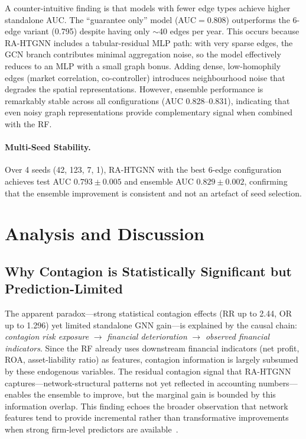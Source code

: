 \documentclass[3p,times,procedia]{elsarticle}
\begin{document}
A counter-intuitive finding is that models with fewer edge types achieve higher standalone AUC.
The ``guarantee only'' model (AUC$=$0.808) outperforms the 6-edge variant (0.795) despite having only $\sim$40 edges per year.
This occurs because RA-HTGNN includes a tabular-residual MLP path: with very sparse edges, the GCN branch contributes minimal aggregation noise, so the model effectively reduces to an MLP with a small graph bonus.
Adding dense, low-homophily edges (market correlation, co-controller) introduces neighbourhood noise that degrades the spatial representations.
However, ensemble performance is remarkably stable across all configurations (AUC 0.828--0.831), indicating that even noisy graph representations provide complementary signal when combined with the RF.

\paragraph{Multi-Seed Stability.}
Over 4 seeds (42, 123, 7, 1), RA-HTGNN with the best 6-edge configuration achieves test AUC $0.793 \pm 0.005$ and ensemble AUC $0.829 \pm 0.002$, confirming that the ensemble improvement is consistent and not an artefact of seed selection.


\section{Analysis and Discussion}
\label{sec:analysis}

\subsection{Why Contagion is Statistically Significant but Prediction-Limited}
\label{subsec:why_limited}

The apparent paradox---strong statistical contagion effects (RR up to 2.44, OR up to 1.296) yet limited standalone GNN gain---is explained by the causal chain:
\emph{contagion risk exposure} $\rightarrow$ \emph{financial deterioration} $\rightarrow$ \emph{observed financial indicators}.
Since the RF already uses downstream financial indicators (net profit, ROA, asset-liability ratio) as features, contagion information is largely subsumed by these endogenous variables.
The residual contagion signal that RA-HTGNN captures---network-structural patterns not yet reflected in accounting numbers---enables the ensemble to improve, but the marginal gain is bounded by this information overlap.
This finding echoes the broader observation that network features tend to provide incremental rather than transformative improvements when strong firm-level predictors are available~\cite{wang2022credit}.
\end{document}
